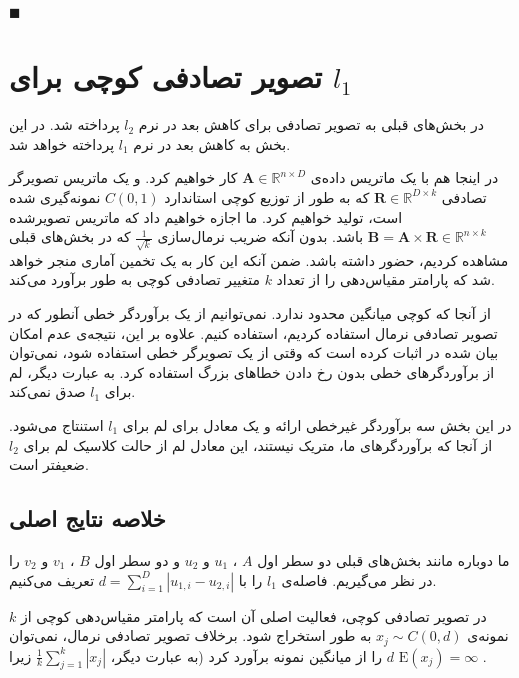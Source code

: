 $\blacksquare$
\bigskip


\section{
تصویر تصادفی کوچی برای 
$l_1$
}
در بخش‌های قبلی به تصویر تصادفی برای کاهش بعد در نرم 
$l_2$
پرداخته شد. در این بخش به کاهش بعد در نرم
$l_1$
پرداخته خواهد شد. 

در اینجا هم با یک ماتریس داده‌ی 
$\mathbf{A} \in \mathbb{R}^{n \times D}$
کار خواهیم کرد. و یک ماتریس تصویرگر تصادفی 
$\mathbf{R} \in \mathbb{R}^{D \times k}$
که به طور 
از توزیع کوچی استاندارد 
$C(0,1)$
نمونه‌گیری شده است، تولید خواهیم کرد.
ما اجازه خواهیم داد که ماتریس تصویرشده 
$\mathbf{B} = \mathbf{A} \times \mathbf{R} \in \mathbb{R}^{n \times k}$
باشد. بدون آنکه ضریب نرمال‌سازی 
$\frac{1}{\sqrt{k}}$
که در بخش‌های قبلی مشاهده کردیم، حضور داشته باشد. ضمن آنکه این کار به یک تخمین آماری منجر خواهد شد که پارامتر مقیاس‌دهی را از تعداد 
$k$
متغییر تصادفی کوچی به طور 
برآورد می‌کند.

از آنجا که کوچی میانگین محدود ندارد. نمی‌توانیم از یک برآوردگر خطی آنطور که در تصویر تصادفی نرمال استفاده کردیم، استفاده کنیم. علاوه بر این، نتیجه‌ی عدم امکان بیان شده در 
\cite{litez32, litez109, litez33}
اثبات کرده است که وقتی از یک تصویرگر خطی استفاده شود، نمی‌توان از برآوردگرهای خطی بدون رخ دادن خطاهای بزرگ استفاده کرد. به عبارت دیگر، لم
برای 
$l_1$
صدق نمی‌کند.

در این بخش سه برآوردگر غیرخطی ارائه و یک معادل برای لم 
برای 
$l_1$
استنتاج  می‌شود. از آنجا که برآوردگرهای ما، متریک نیستند، این معادل لم 
از حالت کلاسیک لم
برای 
$l_2$
ضعیفتر است.

\subsection{
خلاصه نتایج اصلی
}

ما دوباره مانند بخش‌های قبلی دو سطر اول 
$A$
،
$u_1$
و 
$u_2$
و دو سطر اول 
$B$
،
$v_1$
و 
$v_2$
را در نظر می‌گیریم. فاصله‌ی 
$l_1$
را با 
$d = \sum_{i=1}^D | u_{1,i} - u_{2,i} | $
تعریف می‌کنیم. 

در تصویر تصادفی کوچی، فعالیت اصلی آن است که پارامتر مقیاس‌دهی کوچی از 
$k$
نمونه‌ی 
$x_j \sim C(0,d)$
به طور 
استخراج شود. برخلاف تصویر تصادفی نرمال، نمی‌توان 
$d$ 
را از میانگین نمونه برآورد کرد (به عبارت دیگر، 
$\frac{1}{k} \sum_{j=1}^k \left| x_j \right|$
زیرا 
$\mathrm{E}(x_j) = \infty$
. 

